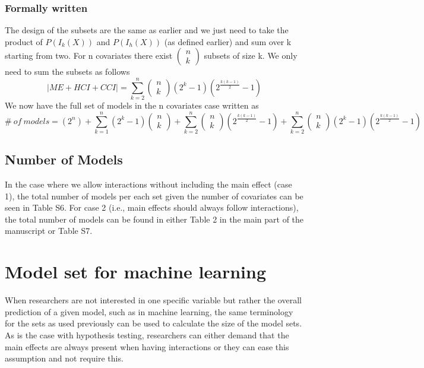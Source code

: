 \subsubsection{Formally written}
The design of the subsets are the same as earlier and we just need to take the product of
$P\left(I_k\left(X\right)\right)$ and $P\left(I_h\left(X\right)\right)$ (as defined earlier)  and sum over k starting from two.
For n covariates there exist $\left( \begin{array}{c}
n \\ 
k \end{array}
\right)$ subsets of size k. We only need to sum the subsets as follows
\[|ME+HCI+CCI|=\sum^n_{k=2}{\left( \begin{array}{c}
n \\ 
k \end{array}
\right)\left(2^k-1\right)\left(2^{\frac{k\left(k-1\right)}{2}}-1\right)}\] 
We now have the full set of models in the n covariates case written as
\[\#\ of\ models=\left(2^n\right)+\sum^n_{k=1}{\left(2^k-1\right)\left( \begin{array}{c}
n \\ 
k \end{array}
\right)}+\sum^n_{k=2}{\left( \begin{array}{c}
n \\ 
k \end{array}
\right)\left(2^{\frac{k\left(k-1\right)}{2}}-1\right)}+\sum^n_{k=2}{\left( \begin{array}{c}
n \\ 
k \end{array}
\right)\left(2^k-1\right)\left(2^{\frac{k\left(k-1\right)}{2}}-1\right)}\] 
\subsection{Number of Models}

\noindent In the case where we allow interactions without including the main effect (case 1), the total number of models per each set given the number of covariates can be seen in Table S6. For case 2 (i.e., main effects should always follow interactions), the total number of models can be found in either Table 2 in the main part of the manuscript or Table S7. 






\section{Model set for machine learning}
When researchers are not interested in one specific variable but rather the overall prediction of a given model, such as in machine learning, the same terminology for the sets as used previously can be used to calculate the size of the model sets. 
As is the case with hypothesis testing, researchers can either demand that the main effects are always present when having interactions or they can ease this assumption and not require this. \\

